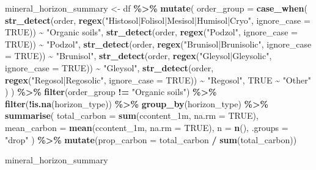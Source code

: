 \documentclass[
]{article}
\newenvironment{Shaded}{\begin{snugshade}}{\end{snugshade}}
\newcommand{\AttributeTok}[1]{\textcolor[rgb]{0.13,0.29,0.53}{#1}}
\newcommand{\ConstantTok}[1]{\textcolor[rgb]{0.56,0.35,0.01}{#1}}
\newcommand{\FunctionTok}[1]{\textcolor[rgb]{0.13,0.29,0.53}{\textbf{#1}}}
\newcommand{\NormalTok}[1]{#1}
\newcommand{\OtherTok}[1]{\textcolor[rgb]{0.56,0.35,0.01}{#1}}
\newcommand{\SpecialCharTok}[1]{\textcolor[rgb]{0.81,0.36,0.00}{\textbf{#1}}}
\newcommand{\StringTok}[1]{\textcolor[rgb]{0.31,0.60,0.02}{#1}}
\begin{document}
\begin{Shaded}
\begin{Highlighting}[]
\NormalTok{mineral\_horizon\_summary }\OtherTok{\textless{}{-}}\NormalTok{ df }\SpecialCharTok{\%\textgreater{}\%}
  \FunctionTok{mutate}\NormalTok{(}
    \AttributeTok{order\_group =} \FunctionTok{case\_when}\NormalTok{(}
      \FunctionTok{str\_detect}\NormalTok{(order, }\FunctionTok{regex}\NormalTok{(}\StringTok{"Histosol|Folisol|Mesisol|Humisol|Cryo"}\NormalTok{, }\AttributeTok{ignore\_case =} \ConstantTok{TRUE}\NormalTok{)) }\SpecialCharTok{\textasciitilde{}} \StringTok{"Organic soils"}\NormalTok{,}
      \FunctionTok{str\_detect}\NormalTok{(order, }\FunctionTok{regex}\NormalTok{(}\StringTok{"Podzol"}\NormalTok{, }\AttributeTok{ignore\_case =} \ConstantTok{TRUE}\NormalTok{)) }\SpecialCharTok{\textasciitilde{}} \StringTok{"Podzol"}\NormalTok{,}
      \FunctionTok{str\_detect}\NormalTok{(order, }\FunctionTok{regex}\NormalTok{(}\StringTok{"Brunisol|Brunisolic"}\NormalTok{, }\AttributeTok{ignore\_case =} \ConstantTok{TRUE}\NormalTok{)) }\SpecialCharTok{\textasciitilde{}} \StringTok{"Brunisol"}\NormalTok{,}
      \FunctionTok{str\_detect}\NormalTok{(order, }\FunctionTok{regex}\NormalTok{(}\StringTok{"Gleysol|Gleysolic"}\NormalTok{, }\AttributeTok{ignore\_case =} \ConstantTok{TRUE}\NormalTok{)) }\SpecialCharTok{\textasciitilde{}} \StringTok{"Gleysol"}\NormalTok{,}
      \FunctionTok{str\_detect}\NormalTok{(order, }\FunctionTok{regex}\NormalTok{(}\StringTok{"Regosol|Regosolic"}\NormalTok{, }\AttributeTok{ignore\_case =} \ConstantTok{TRUE}\NormalTok{)) }\SpecialCharTok{\textasciitilde{}} \StringTok{"Regosol"}\NormalTok{,}
      \ConstantTok{TRUE} \SpecialCharTok{\textasciitilde{}} \StringTok{"Other"}
\NormalTok{    )}
\NormalTok{  ) }\SpecialCharTok{\%\textgreater{}\%}
  \FunctionTok{filter}\NormalTok{(order\_group }\SpecialCharTok{!=} \StringTok{"Organic soils"}\NormalTok{) }\SpecialCharTok{\%\textgreater{}\%}
  \FunctionTok{filter}\NormalTok{(}\SpecialCharTok{!}\FunctionTok{is.na}\NormalTok{(horizon\_type)) }\SpecialCharTok{\%\textgreater{}\%}
  \FunctionTok{group\_by}\NormalTok{(horizon\_type) }\SpecialCharTok{\%\textgreater{}\%}
  \FunctionTok{summarise}\NormalTok{(}
    \AttributeTok{total\_carbon =} \FunctionTok{sum}\NormalTok{(ccontent\_1m, }\AttributeTok{na.rm =} \ConstantTok{TRUE}\NormalTok{),}
    \AttributeTok{mean\_carbon =} \FunctionTok{mean}\NormalTok{(ccontent\_1m, }\AttributeTok{na.rm =} \ConstantTok{TRUE}\NormalTok{),}
    \AttributeTok{n =} \FunctionTok{n}\NormalTok{(),}
    \AttributeTok{.groups =} \StringTok{"drop"}
\NormalTok{  ) }\SpecialCharTok{\%\textgreater{}\%}
  \FunctionTok{mutate}\NormalTok{(}\AttributeTok{prop\_carbon =}\NormalTok{ total\_carbon }\SpecialCharTok{/} \FunctionTok{sum}\NormalTok{(total\_carbon))}

\NormalTok{mineral\_horizon\_summary}
\end{Highlighting}
\end{Shaded}
\end{document}
